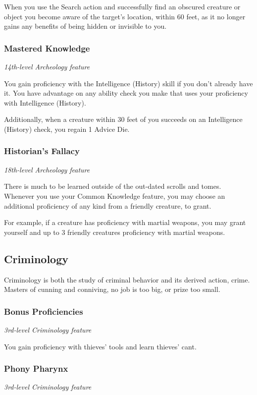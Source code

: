 \documentclass[letterpaper,openany,twoside,twocolumn]{book}
\begin{document}
	When you use the Search action and successfully find an obscured creature or object you become aware of the target's location, within 60 feet, as it no longer gains any benefits of being hidden or invisible to you.
	
	\subsubsection*{Mastered Knowledge}
	\textnormal{\textit{14th-level Archeology feature}}
	
	You gain proficiency with the Intelligence (History) skill if you don’t already have it. You have advantage on any ability check you make that uses your proficiency with Intelligence (History).
	
	Additionally, when a creature within 30 feet of you succeeds on an Intelligence (History) check, you regain 1 Advice Die.
	
	\subsubsection*{Historian's Fallacy}
	\textnormal{\textit{18th-level Archeology feature}}
	
	There is much to be learned outside of the out-dated scrolls and tomes. Whenever you use your Common Knowledge feature, you may choose an additional proficiency of any kind from a friendly creature, to grant.
	
	For example, if a creature has proficiency with martial weapons, you may grant yourself and up to 3 friendly creatures proficiency with martial weapons.
	
	\subsection*{Criminology}
	Criminology is both the study of criminal behavior and its derived action, crime. Masters of cunning and conniving, no job is too big, or prize too small.
	
	\subsubsection*{Bonus Proficiencies}
	\textnormal{\textit{3rd-level Criminology feature}}
	
	You gain proficiency with thieves’ tools and learn thieves’ cant.
	
	\subsubsection*{Phony Pharynx}
	\textnormal{\textit{3rd-level Criminology feature}}
	
\end{document}
